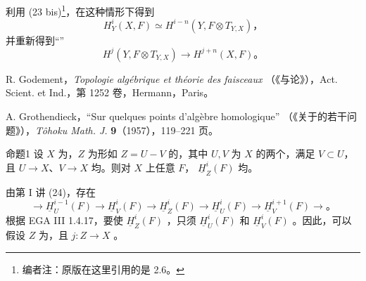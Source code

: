 利用 (23 bis)\footnote{编者注：原版在这里引用的是 2.6。}，在这种情形下得到
\[
H_Y^i(X,F)\simeq H^{i-n}(Y,F\otimes T_{Y,X})，\tag{31}
\]
并重新得到“”
\[
H^j(Y,F\otimes T_{Y,X})\longrightarrow H^{j+n}(X,F)。\tag{32}
\]

\noindent [Godement]\quad R. Godement，\emph{Topologie algébrique et théorie des faisceaux}
（《与论》），Act. Scient. et Ind.，第 1252 卷，Hermann，Paris。

\noindent [Tôhoku]\quad A. Grothendieck，“Sur quelques points d'algèbre homologique”
（《关于的若干问题》），\emph{Tôhoku Math. J.} \textbf{9}（1957），119--221 页。

\begin{SGAresult}{命题}{1}
设 $X$ 为，$Z$ 为形如 $Z=U-V$ 的，其中 $U,V$ 为 $X$ 的两个，满足 $V\subset U$，且 $U\to X$、$V\to X$ 均。则对 $X$ 上任意 $F$， $\underline H_Z^i(F)$ 均。
\end{SGAresult}
由第 I 讲 (24)，存在
\[
\longrightarrow\underline H_U^{i-1}(F)\longrightarrow\underline H_V^i(F)
\longrightarrow\underline H_Z^i(F)\longrightarrow\underline H_U^i(F)
\longrightarrow\underline H_V^{i+1}(F)\longrightarrow。
\]
根据 EGA III 1.4.17，要使 $\underline H_Z^i(F)$ ，只须 $\underline H_U^i(F)$ 和 $\underline H_V^i(F)$ 。因此，可以假设 $Z$ 为，且 $j:Z\to X$ 。


